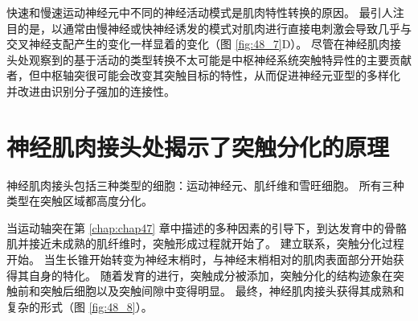 快速和慢速运动神经元中不同的神经活动模式是肌肉特性转换的原因。
最引人注目的是，以通常由慢神经或快神经诱发的模式对肌肉进行直接电刺激会导致几乎与交叉神经支配产生的变化一样显着的变化（图 \ref{fig:48_7}D）。
尽管在神经肌肉接头处观察到的基于活动的类型转换不太可能是中枢神经系统突触特异性的主要贡献者，但中枢轴突很可能会改变其突触目标的特性，从而促进神经元亚型的多样化 并改进由识别分子强加的连接性。



\section{神经肌肉接头处揭示了突触分化的原理}

神经肌肉接头包括三种类型的细胞：运动神经元、肌纤维和雪旺细胞。
所有三种类型在突触区域都高度分化。


当运动轴突在第 \ref{chap:chap47} 章中描述的多种因素的引导下，到达发育中的骨骼肌并接近未成熟的肌纤维时，突触形成过程就开始了。
建立联系，突触分化过程开始。
当生长锥开始转变为神经末梢时，与神经末梢相对的肌肉表面部分开始获得其自身的特化。
随着发育的进行，突触成分被添加，突触分化的结构迹象在突触前和突触后细胞以及突触间隙中变得明显。
最终，神经肌肉接头获得其成熟和复杂的形式（图 \ref{fig:48_8}）。


